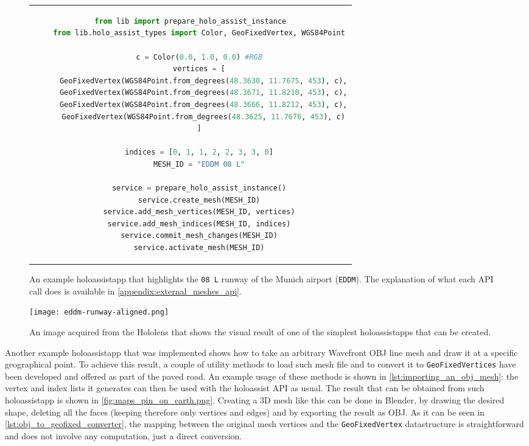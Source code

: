 \begin{figure}
  \centering
  \begin{tabular}{c}
  \begin{lstlisting}[language=python]
    from lib import prepare_holo_assist_instance
    from lib.holo_assist_types import Color, GeoFixedVertex, WGS84Point

    c = Color(0.0, 1.0, 0.0) #RGB
    vertices = [
      GeoFixedVertex(WGS84Point.from_degrees(48.3630, 11.7675, 453), c),
      GeoFixedVertex(WGS84Point.from_degrees(48.3671, 11.8210, 453), c),
      GeoFixedVertex(WGS84Point.from_degrees(48.3666, 11.8212, 453), c),
      GeoFixedVertex(WGS84Point.from_degrees(48.3625, 11.7676, 453), c)
    ]

    indices = [0, 1, 1, 2, 2, 3, 3, 0]
    MESH_ID = "EDDM 08 L"

    service = prepare_holo_assist_instance()
    service.create_mesh(MESH_ID)
    service.add_mesh_vertices(MESH_ID, vertices)
    service.add_mesh_indices(MESH_ID, indices)
    service.commit_mesh_changes(MESH_ID)
    service.activate_mesh(MESH_ID)
  \end{lstlisting}
  \end{tabular}
  \caption{An example \gls{holoassistapp} that highlights the \texttt{08 L} runway of the Munich airport (\texttt{EDDM}). The explanation of what each \gls{API} call does is available in \autoref{appendix:external_meshes_api}.}\label{lst:highlight_eddm_api_code}
\end{figure}

\begin{figure}
  \centering
  \texttt{[image: eddm-runway-aligned.png]}
  \caption{An image acquired from the Hololens that shows the visual result of one of the simplest \glspl{holoassistapp} that can be created.}\label{fig:eddm_highlighted.png}
\end{figure}

Another example \gls{holoassistapp} that was implemented shows how to take an arbitrary Wavefront OBJ line mesh and draw it at a specific geographical point. To achieve this result, a couple of utility methods to load such mesh file and to convert it to \texttt{GeoFixedVertices} have been developed and offered as part of the paved road. An example usage of these methods is shown in \autoref{lst:importing_an_obj_mesh}: the vertex and index lists it generates can then be used with the \gls{holoassist} \gls{API} as usual. The result that can be obtained from such \gls{holoassistapp} is shown in \autoref{fig:maps_pin_on_earth.png}. Creating a 3D mesh like this can be done in Blender, by drawing the desired shape, deleting all the faces (keeping therefore only vertices and edges) and by exporting the result as OBJ. As it can be seen in \autoref{lst:obj_to_geofixed_converter}, the mapping between the original mesh vertices and the \texttt{GeoFixedVertex} datastructure is straightforward and does not involve any computation, just a direct conversion.

